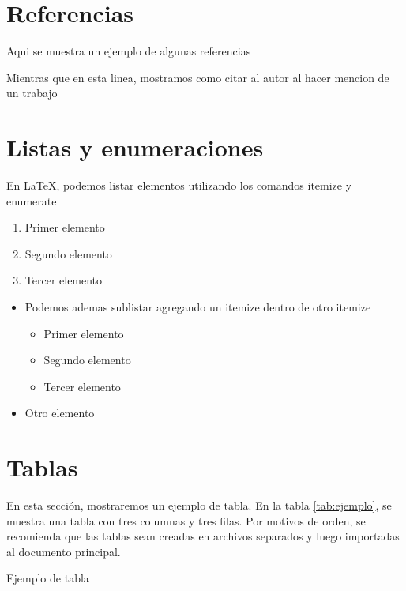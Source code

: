 \section{Referencias}
Aqui se muestra un ejemplo de algunas referencias
\cite{godoyNamedEntityRecognition2023, torresPredictingCardiovascularRehabilitation2023}

Mientras que en esta linea, mostramos como citar al autor al hacer mencion de un trabajo \citeauthor{melladoDeepLearningClassifier2023}

\section{Listas y enumeraciones}
En \LaTeX, podemos listar elementos utilizando los comandos itemize y enumerate

\begin{enumerate}
    \item Primer elemento
    \item Segundo elemento
    \item Tercer elemento
\end{enumerate}

\begin{itemize}
    \item Podemos ademas sublistar agregando un itemize dentro de otro itemize
    \begin{itemize}
        \item Primer elemento
        \item Segundo elemento
        \item Tercer elemento
    \end{itemize}
    \item Otro elemento
\end{itemize}


\section{Tablas}
En esta sección, mostraremos un ejemplo de tabla. En la tabla \ref{tab:ejemplo}, se muestra una tabla con tres columnas y tres filas. Por motivos de orden, se recomienda que las tablas sean creadas en archivos separados y luego importadas al documento principal.

\begin{table}
    \centering
    \caption{Ejemplo de tabla}
    \label{tab:ejemplo}
    
\end{table}

